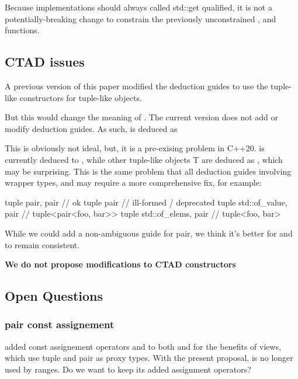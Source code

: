 \documentclass{wg21}
\begin{document}
\begin{note}
Because implementations should always called std::get qualified, it is not a potentially-breaking change to constrain the previously unconstrained ,  and 
functions.
\end{note}


\subsection{CTAD issues}

A previous version of this paper modified the deduction guides to use the tuple-like constructors for tuple-like objects.

But this would change the meaning of .
The current version does not add or modify deduction guides.
As such,  is deduced as 

This is obviously not ideal, but, it is a pre-exising problem in C++20.  is currently deduced to ,
while other tuple-like objects T are deduced as , which may be surprising.
This is the same problem that all deduction guides involving wrapper types, and may require a more comprehensive fix, for example:

\begin{colorblock}
tuple {pair, pair } // ok
tuple {pair} // ill-formed / deprecated
tuple {std::of_value, pair }  // tuple<pair<foo, bar>>
tuple {std::of_elems, pair }  // tuple<foo, bar>
\end{colorblock}

While we could add a non-ambiguous guide for pair, we think it's better for  and  to remain consistent.

\textbf{We do not propose modifications to CTAD constructors}



\subsection{Open Questions}

\subsubsection{pair const assignement}

 added const assignement operators and to both  and  for the benefits of views, which use tuple and pair as proxy types.
With the present proposal,  is no longer used by ranges. Do we want to keep its added assignment operators?
\end{document}

